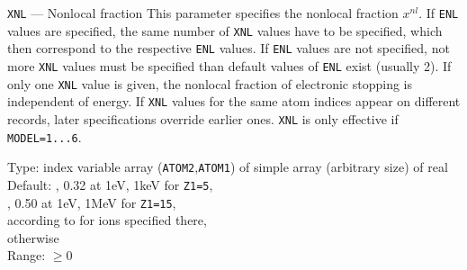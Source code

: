 \begin{keydescription}{\texttt{XNL} --- Nonlocal fraction}
%
  This parameter specifies the nonlocal fraction $x^{nl}$. If \texttt{ENL}
  values are specified, the same number of \texttt{XNL} values have to be 
  specified, which then correspond to the respective \texttt{ENL} values. 
  If \texttt{ENL} values are not specified, not more \texttt{XNL}
  values must be specified than default values of \texttt{ENL} exist (usually
  2). If only one \texttt{XNL} value is given, the nonlocal fraction of
  electronic stopping is independent of energy. If \texttt{XNL} values for
  the same atom indices appear on different records, later specifications
  override earlier ones.
  \ifprivate
  \texttt{XNL} is only effective if \texttt{MODEL=1...6}.
  \fi
  \begin{keytab}
    Type:    \> index variable array (\texttt{ATOM2},\texttt{ATOM1}) 
                of simple array (arbitrary size) of real \\
    Default: , 0.32 at 1eV, 1keV for \texttt{Z1=5}, \\
             , 0.50 at 1eV, 1MeV for \texttt{Z1=15}, \\
             \> according to \cite{I0104} for ions specified there, \\
              otherwise \\
    Range:   \> $\ge 0$
  \end{keytab}
\end{keydescription}

